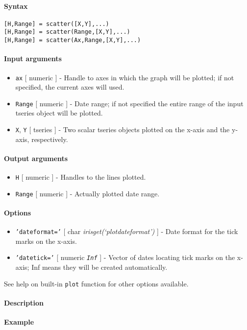 


	\paragraph{Syntax}\label{syntax}

\begin{verbatim}
[H,Range] = scatter([X,Y],...)
[H,Range] = scatter(Range,[X,Y],...)
[H,Range] = scatter(Ax,Range,[X,Y],...)
\end{verbatim}

\paragraph{Input arguments}\label{input-arguments}

\begin{itemize}
\item
  \texttt{ax} {[} numeric {]} - Handle to axes in which the graph will
  be plotted; if not specified, the current axes will used.
\item
  \texttt{Range} {[} numeric {]} - Date range; if not specified the
  entire range of the input tseries object will be plotted.
\item
  \texttt{X}, \texttt{Y} {[} tseries {]} - Two scalar tseries objects
  plotted on the x-axis and the y-axis, respectively.
\end{itemize}

\paragraph{Output arguments}\label{output-arguments}

\begin{itemize}
\item
  \texttt{H} {[} numeric {]} - Handles to the lines plotted.
\item
  \texttt{Range} {[} numeric {]} - Actually plotted date range.
\end{itemize}

\paragraph{Options}\label{options}

\begin{itemize}
\item
  \texttt{'dateformat='} {[} char \textbar{}
  \emph{irisget(`plotdateformat')} {]} - Date format for the tick marks
  on the x-axis.
\item
  \texttt{'datetick='} {[} numeric \textbar{} \emph{\texttt{Inf}} {]} -
  Vector of dates locating tick marks on the x-axis; Inf means they will
  be created automatically.
\end{itemize}

See help on built-in \texttt{plot} function for other options available.

\paragraph{Description}\label{description}

\paragraph{Example}\label{example}


